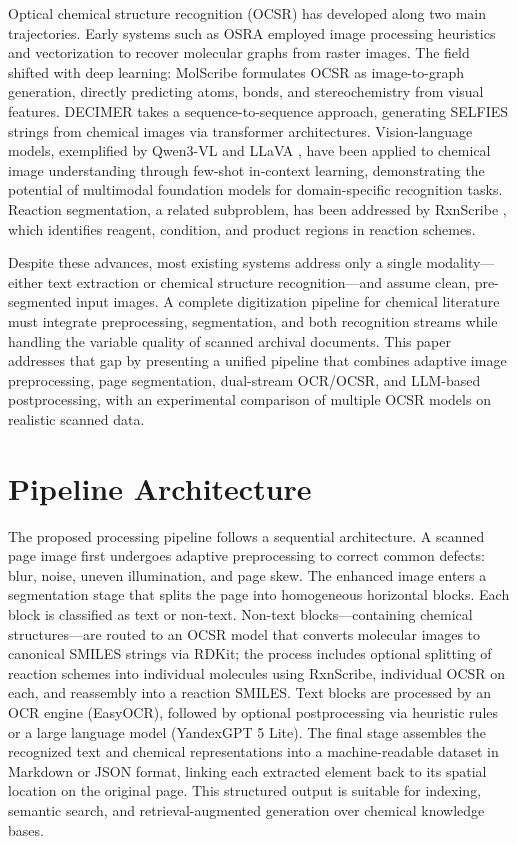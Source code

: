 \documentclass[conference]{IEEEtran}
\begin{document}
Optical chemical structure recognition (OCSR) has developed along two main trajectories. Early systems such as OSRA \cite{refOSRAEn} employed image processing heuristics and vectorization to recover molecular graphs from raster images. The field shifted with deep learning: MolScribe \cite{refMolScribeEn} formulates OCSR as image-to-graph generation, directly predicting atoms, bonds, and stereochemistry from visual features. DECIMER \cite{refDECIMEREn,refDECIMERJournalEn} takes a sequence-to-sequence approach, generating SELFIES strings from chemical images via transformer architectures. Vision-language models, exemplified by Qwen3-VL \cite{refQwen3VLEn} and LLaVA \cite{refLlavaEn}, have been applied to chemical image understanding through few-shot in-context learning, demonstrating the potential of multimodal foundation models for domain-specific recognition tasks. Reaction segmentation, a related subproblem, has been addressed by RxnScribe \cite{refRxnScribeEn}, which identifies reagent, condition, and product regions in reaction schemes.

Despite these advances, most existing systems address only a single modality---either text extraction or chemical structure recognition---and assume clean, pre-segmented input images. A complete digitization pipeline for chemical literature must integrate preprocessing, segmentation, and both recognition streams while handling the variable quality of scanned archival documents. This paper addresses that gap by presenting a unified pipeline that combines adaptive image preprocessing, page segmentation, dual-stream OCR/OCSR, and LLM-based postprocessing, with an experimental comparison of multiple OCSR models on realistic scanned data.

\section{Pipeline Architecture}

The proposed processing pipeline follows a sequential architecture. A scanned page image first undergoes adaptive preprocessing to correct common defects: blur, noise, uneven illumination, and page skew. The enhanced image enters a segmentation stage that splits the page into homogeneous horizontal blocks. Each block is classified as text or non-text. Non-text blocks---containing chemical structures---are routed to an OCSR model that converts molecular images to canon\-ical SMILES strings via RDKit; the process includes optional splitting of reaction schemes into individual molecules using RxnScribe, individual OCSR on each, and reassembly into a reaction SMILES. Text blocks are processed by an OCR engine (EasyOCR), followed by optional postprocessing via heuristic rules or a large language model (YandexGPT 5 Lite). The final stage assembles the recognized text and chemical representations into a machine-readable dataset in Markdown or JSON format, linking each extracted element back to its spatial location on the original page. This structured output is suitable for indexing, semantic search, and retrieval-augmented generation over chemical knowledge bases.
\end{document}
